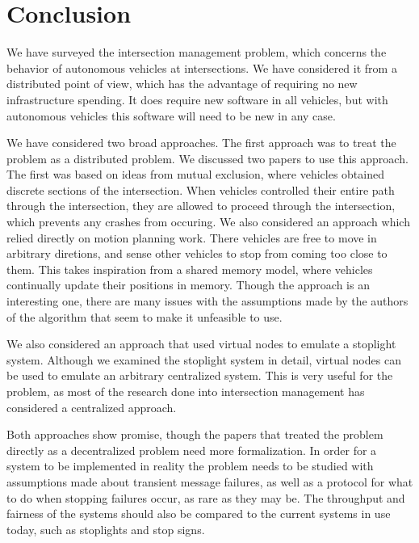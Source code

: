 \documentclass[12pt]{article}
\begin{document}
\section{Conclusion}
We have surveyed the intersection management problem, which concerns the behavior of autonomous vehicles at intersections. We have considered it from a distributed point of view, which has the advantage of requiring no new infrastructure spending. It does require new software in all vehicles, but with autonomous vehicles this software will need to be new in any case.\par
We have considered two broad approaches. The first approach was to treat the problem as a distributed problem. We discussed two papers to use this approach. The first was based on ideas from mutual exclusion, where vehicles obtained discrete sections of the intersection. When vehicles controlled their entire path through the intersection, they are allowed to proceed through the intersection, which prevents any crashes from occuring. We also considered an approach which relied directly on motion planning work. There vehicles are free to move in arbitrary diretions, and sense other vehicles to stop from coming too close to them. This takes inspiration from a shared memory model, where vehicles continually update their positions in memory. Though the approach is an interesting one, there are many issues with the assumptions made by the authors of the algorithm that seem to make it unfeasible to use.\par
We also considered an approach that used virtual nodes to emulate a stoplight system. Although we examined the stoplight system in detail, virtual nodes can be used to emulate an arbitrary centralized system. This is very useful for the problem, as most of the research done into intersection management has considered a centralized approach.\par
Both approaches show promise, though the papers that treated the problem directly as a decentralized problem need more formalization. In order for a system to be implemented in reality the problem needs to be studied with assumptions made about transient message failures, as well as a protocol for what to do when stopping failures occur, as rare as they may be. The throughput and fairness of the systems should also be compared to the current systems in use today, such as stoplights and stop signs.

\label{sec:conclusion}

\pagebreak
\end{document}
